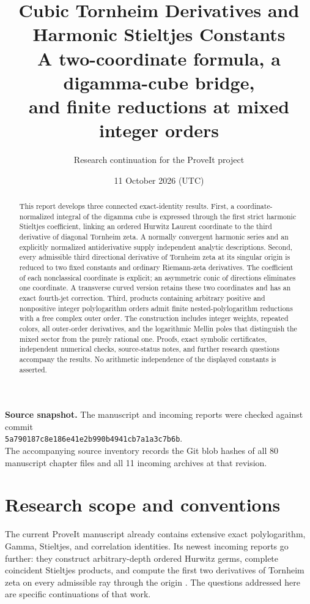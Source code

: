 \documentclass[11pt]{article}
\title{\color{ResearchBlue}\bfseries Cubic Tornheim Derivatives and\\Harmonic Stieltjes Constants\\[6pt]\large A two-coordinate formula, a digamma-cube bridge,\\and finite reductions at mixed integer orders}
\author{Research continuation for the ProveIt project}
\date{11 October 2026 (UTC)}
\numberwithin{equation}{section}
\theoremstyle{definition}
\theoremstyle{remark}
\newcommand{\sourcecommit}{\texttt{5a790187c8e186e41e2b990b4941cb7a1a3c7b6b}}
\begin{document}
\maketitle
\thispagestyle{empty}
\begin{abstract}
This report develops three connected exact-identity results. First, a
coordinate-normalized integral of the digamma cube is expressed through the
first strict harmonic Stieltjes coefficient, linking an ordered Hurwitz
Laurent coordinate to the third derivative of diagonal Tornheim zeta.
A normally convergent harmonic series and an explicitly normalized
antiderivative supply independent analytic descriptions. Second, every
admissible third directional derivative of Tornheim zeta at its singular
origin is reduced to two fixed constants and ordinary Riemann-zeta
derivatives. The coefficient of each nonclassical coordinate is explicit;
an asymmetric conic of directions eliminates one coordinate. A transverse
curved version retains these two coordinates and has an exact fourth-jet
correction. Third, products containing arbitrary positive and nonpositive
integer polylogarithm orders admit finite nested-polylogarithm reductions
with a free complex outer order. The construction includes integer
weights, repeated colors, all outer-order derivatives, and the logarithmic
Mellin poles that distinguish the mixed sector from the purely rational
one. Proofs, exact symbolic certificates, independent numerical checks,
source-status notes, and further research questions accompany the results.
No arithmetic independence of the displayed constants is asserted.
\end{abstract}
\vfill
\noindent\textbf{Source snapshot.} The manuscript and incoming reports were
checked against commit\\[3pt]
\sourcecommit.\\[5pt]
The accompanying source inventory records the Git blob hashes of all
80 manuscript chapter files and all 11 incoming archives at that revision.
\clearpage
\tableofcontents
\clearpage
\section{Research scope and conventions}
\label{sec:scope}

The current ProveIt manuscript already contains extensive exact
polylogarithm, Gamma, Stieltjes, and correlation identities. Its newest
incoming reports go further: they construct arbitrary-depth ordered
Hurwitz germs, complete coincident Stieltjes products, and compute the
first two derivatives of Tornheim zeta on every admissible ray through
the origin \cite{Repo,IncomingOrdered,IncomingCoincident}. The questions
addressed here are specific continuations of that work.
\end{document}
